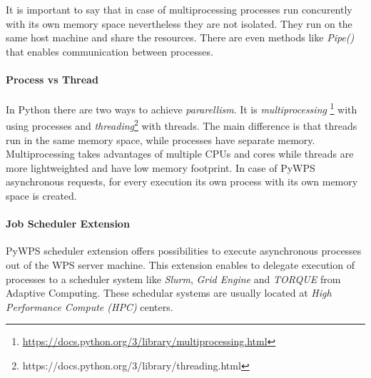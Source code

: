 \documentclass[12pt,a4paper]{article}
\begin{document}
It is important to say that in case of multiprocessing processes run concurently with its own memory space nevertheless they are not isolated.
They run on the same host machine and share the resources. There are even methods like \textit{Pipe()} that enables communication between 
processes.

\paragraph{Process vs Thread} In Python there are two ways to achieve \textit{pararellism}. It is \textit{multiprocessing}
\footnote{\url{https://docs.python.org/3/library/multiprocessing.html}} with using processes and \textit{threading}\footnote{https://docs.python.org/3/library/threading.html} with threads. The main difference is that threads run in the same memory space, while processes
have separate memory. Multiprocessing takes advantages of multiple CPUs and cores while threads are more lightweighted and have low memory
footprint. In case of PyWPS asynchronous requests, for every execution its own process with its own memory space is created.

\paragraph{Job Scheduler Extension}
PyWPS scheduler extension offers possibilities to execute asynchronous processes out of the WPS server machine.
This extension enables to delegate execution of processes to a scheduler system like \textit{Slurm}, \textit{Grid Engine} 
and \textit{TORQUE} from Adaptive Computing. These schedular systems are usually located at \textit{High Performance Compute (HPC)}
centers.

\begin{figure}[h!]
\centering
\begin{floatrow}
\end{floatrow}
\end{figure}
\end{document}
